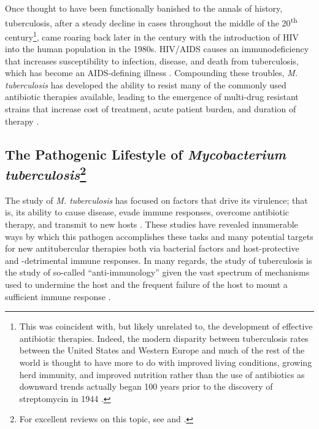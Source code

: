 Once thought to have been functionally banished to the annals of history, tuberculosis, after a steady decline in cases throughout the middle of the 20\textsuperscript{th} century\footnote{This was coincident with, but likely unrelated to, the development of effective antibiotic therapies. Indeed, the modern disparity between tuberculosis rates between the United States and Western Europe and much of the rest of the world is thought to have more to do with improved living conditions, growing herd immunity, and improved nutrition rather than the use of antibiotics as downward trends actually began 100 years prior to the discovery of streptomycin in 1944 \citep{Lowbury1958}.}, came roaring back later in the century with the introduction of HIV into the human population in the 1980s. HIV/AIDS causes an immunodeficiency that increases susceptibility to infection, disease, and death from tuberculosis, which has become an AIDS\hyp{}defining illness \citep{Drobniewski1995, Selwyn1992}. Compounding these troubles, \textit{M. tuberculosis} has developed the ability to resist many of the commonly used antibiotic therapies available, leading to the emergence of multi\hyp{}drug resistant strains that increase cost of treatment, acute patient burden, and duration of therapy \citep{Matteelli2014}.

\subsection[The Pathogenic Lifestyle of \textit{Mycobacterium tuberculosis}]{The Pathogenic Lifestyle of \textit{Mycobacterium tuberculosis}\footnote{For excellent reviews on this topic, see  and .}}\label{path:tb}

The study of \textit{M. tuberculosis} has focused on factors that drive its virulence; that is, its ability to cause disease, evade immune responses, overcome antibiotic therapy, and transmit to new hosts \citep{Glickman2001b}. These studies have revealed innumerable ways by which this pathogen accomplishes these tasks and many potential targets for new antitubercular therapies both via bacterial factors and host\hyp{}protective and \hyp{}detrimental immune responses. In many regards, the study of tuberculosis is the study of so\hyp{}called ``anti\hyp{}immunology'' given the vast spectrum of mechanisms used to undermine the host and the frequent failure of the host to mount a sufficient immune response \citep{Diacovich2010, Finlay2006}.

